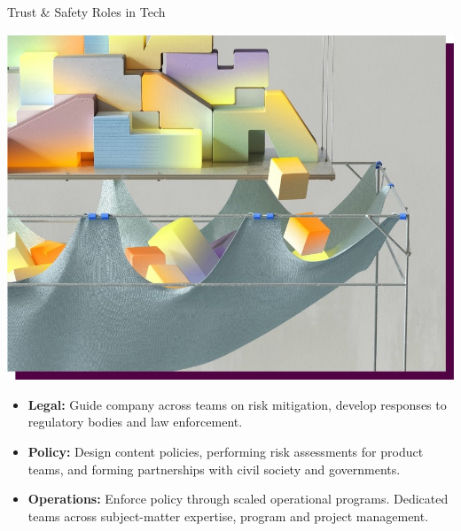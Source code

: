 \documentclass[nobackground,dvipsnames,table]{beamer}
\begin{document}
\begin{frame}{Trust \& Safety Roles in Tech}

\begin{center}
    \includegraphics[width=.55\textwidth]{img/fig12.jpg}
\end{center}
    \footnotesize{
        \begin{itemize} 
            \item \textbf{Legal:} Guide company across teams on risk mitigation, develop responses to regulatory bodies and law enforcement.
            \item \textbf{Policy:} Design content policies, performing risk assessments for product teams, and forming partnerships with civil society and governments.
            \item \textbf{Operations:} Enforce policy through scaled operational programs. Dedicated teams across subject-matter expertise, program and project management.
        \end{itemize}
    }

\end{frame}
\end{document}
